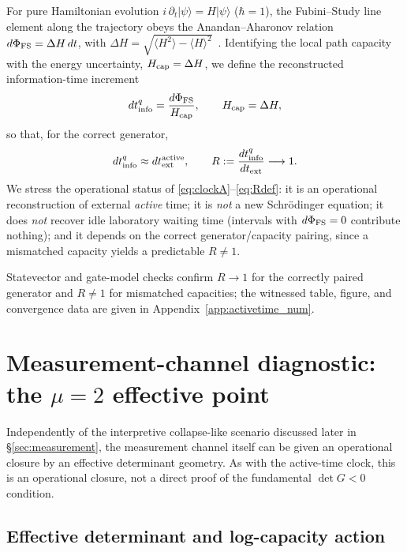 \documentclass[11pt,a4paper]{article}
\theoremstyle{definition}
\begin{document}
For pure Hamiltonian evolution $i\,\partial_t|\psi\rangle=H|\psi\rangle$
($\hbar=1$), the Fubini--Study line element along the trajectory obeys the
Anandan--Aharonov relation $d\Phi_{\rm FS}=\Delta H\,dt$, with
$\Delta H=\sqrt{\langle H^2\rangle-\langle H\rangle^2}$~\cite{ProvostVallee,AnandanAharonov}.
Identifying the local path capacity with the energy uncertainty,
$H_{\rm cap}=\Delta H$, we define the reconstructed information-time
increment
\begin{equation}
dt_{\rm info}^{q}=\frac{d\Phi_{\rm FS}}{H_{\rm cap}},\qquad H_{\rm cap}=\Delta H,
\label{eq:clockA}
\end{equation}
so that, for the correct generator,
\begin{equation}
dt_{\rm info}^{q}\approx dt_{\rm ext}^{\rm active},\qquad
R:=\frac{dt_{\rm info}^{q}}{dt_{\rm ext}}\longrightarrow 1 .
\label{eq:Rdef}
\end{equation}
We stress the operational status of \eqref{eq:clockA}--\eqref{eq:Rdef}: it
is an operational reconstruction of external \emph{active} time; it is
\emph{not} a new Schr\"odinger equation; it does \emph{not} recover idle
laboratory waiting time (intervals with $d\Phi_{\rm FS}=0$ contribute
nothing); and it depends on the correct generator/capacity pairing, since
a mismatched capacity yields a predictable $R\neq1$.

Statevector and gate-model checks confirm $R\to1$ for the correctly paired generator and $R\neq1$ for mismatched capacities; the witnessed table, figure, and convergence data are given in Appendix~\ref{app:activetime_num}.

\section{Measurement-channel diagnostic: the $\mu=2$ effective point}\label{sec:mu2}

Independently of the interpretive collapse-like scenario discussed later
in \S\ref{sec:measurement}, the measurement channel
itself can be given an operational closure by an effective determinant
geometry. As with the active-time clock, this is an operational closure,
not a direct proof of the fundamental $\det G<0$ condition.

\subsection{Effective determinant and log-capacity action}
\end{document}
